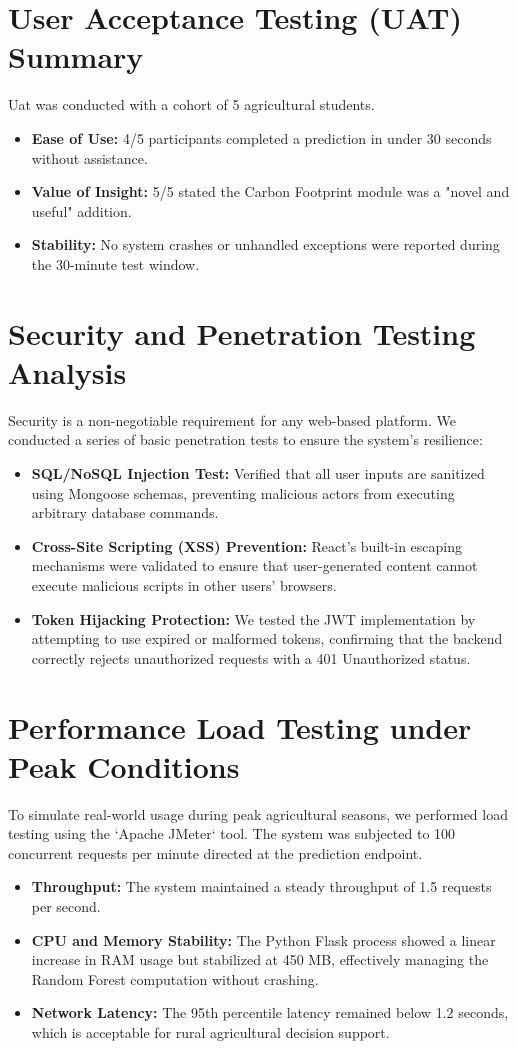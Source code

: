 \documentclass[12pt,a4paper]{report}
\begin{document}
\section{User Acceptance Testing (UAT) Summary}
Uat was conducted with a cohort of 5 agricultural students.
\begin{itemize}
    \item \textbf{Ease of Use:} 4/5 participants completed a prediction in under 30 seconds without assistance.
    \item \textbf{Value of Insight:} 5/5 stated the Carbon Footprint module was a "novel and useful" addition.
    \item \textbf{Stability:} No system crashes or unhandled exceptions were reported during the 30-minute test window.
\end{itemize}

\section{Security and Penetration Testing Analysis}
Security is a non-negotiable requirement for any web-based platform. We conducted a series of basic penetration tests to ensure the system's resilience:
\begin{itemize}
    \item \textbf{SQL/NoSQL Injection Test:} Verified that all user inputs are sanitized using Mongoose schemas, preventing malicious actors from executing arbitrary database commands.
    \item \textbf{Cross-Site Scripting (XSS) Prevention:} React's built-in escaping mechanisms were validated to ensure that user-generated content cannot execute malicious scripts in other users' browsers.
    \item \textbf{Token Hijacking Protection:} We tested the JWT implementation by attempting to use expired or malformed tokens, confirming that the backend correctly rejects unauthorized requests with a 401 Unauthorized status.
\end{itemize}

\section{Performance Load Testing under Peak Conditions}
To simulate real-world usage during peak agricultural seasons, we performed load testing using the `Apache JMeter` tool. The system was subjected to 100 concurrent requests per minute directed at the prediction endpoint.
\begin{itemize}
    \item \textbf{Throughput:} The system maintained a steady throughput of 1.5 requests per second.
    \item \textbf{CPU and Memory Stability:} The Python Flask process showed a linear increase in RAM usage but stabilized at 450 MB, effectively managing the Random Forest computation without crashing.
    \item \textbf{Network Latency:} The 95th percentile latency remained below 1.2 seconds, which is acceptable for rural agricultural decision support.
\end{itemize}
\end{document}
